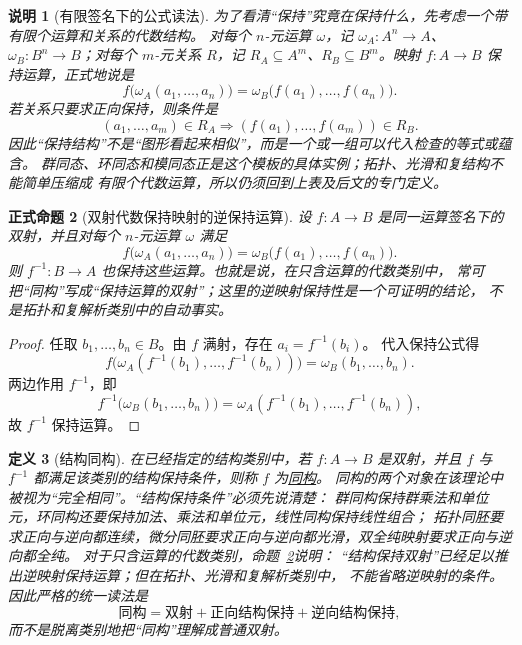 \documentclass[UTF8,fontset=none,a4paper,11pt]{ctexart}
\theoremstyle{foundation-definition}
\newtheorem{definition}{定义}[section]
\theoremstyle{foundation-theorem}
\theoremstyle{foundation-proposition}
\newtheorem{proposition}[definition]{正式命题}
\theoremstyle{foundation-example}
\theoremstyle{foundation-remark}
\newtheorem{remark}[definition]{说明}
\theoremstyle{foundation-theorem}
\newcommand{\term}[2]{\hyperref[#1]{#2}}
\begin{document}
\begin{remark}[有限签名下的公式读法]\label{rem:structure-signature-formulas}
为了看清“保持”究竟在保持什么，先考虑一个带有限个运算和关系的代数结构。
对每个 \(n\)-元运算 \(\omega\)，记
\(\omega_A:A^n\to A\)、\(\omega_B:B^n\to B\)；对每个 \(m\)-元关系 \(R\)，记
\(R_A\subseteq A^m\)、\(R_B\subseteq B^m\)。映射 \(f:A\to B\) 保持运算，正式地说是
\[
 f\bigl(\omega_A(a_1,\ldots,a_n)\bigr)
 =\omega_B\bigl(f(a_1),\ldots,f(a_n)\bigr).
\]
若关系只要求正向保持，则条件是
\[
 (a_1,\ldots,a_m)\in R_A
 \Longrightarrow
 (f(a_1),\ldots,f(a_m))\in R_B.
\]
因此“保持结构”不是“图形看起来相似”，而是一个或一组可以代入检查的等式或蕴含。
群同态、环同态和模同态正是这个模板的具体实例；拓扑、光滑和复结构不能简单压缩成
有限个代数运算，所以仍须回到上表及后文的专门定义。\end{remark}

\begin{proposition}[双射代数保持映射的逆保持运算]\label{prop:bijective-algebraic-map-inverse}
设 \(f:A\to B\) 是同一运算签名下的双射，并且对每个 \(n\)-元运算 \(\omega\) 满足
\[
f\bigl(\omega_A(a_1,\ldots,a_n)\bigr)
=\omega_B\bigl(f(a_1),\ldots,f(a_n)\bigr).
\]
则 \(f^{-1}:B\to A\) 也保持这些运算。也就是说，在只含运算的代数类别中，
常可把“同构”写成“保持运算的双射”；这里的逆映射保持性是一个可证明的结论，
不是拓扑和复解析类别中的自动事实。
\end{proposition}

\begin{proof}
任取 \(b_1,\ldots,b_n\in B\)。由 \(f\) 满射，存在 \(a_i=f^{-1}(b_i)\)。
代入保持公式得
\[
f\bigl(\omega_A(f^{-1}(b_1),\ldots,f^{-1}(b_n))\bigr)
=\omega_B(b_1,\ldots,b_n).
\]
两边作用 \(f^{-1}\)，即
\[
f^{-1}\bigl(\omega_B(b_1,\ldots,b_n)\bigr)
=\omega_A(f^{-1}(b_1),\ldots,f^{-1}(b_n)),
\]
故 \(f^{-1}\) 保持运算。\end{proof}

\begin{definition}[结构同构]\label{def:isomorphism}
在已经指定的结构类别中，若 \(f:A\to B\) 是双射，并且 \(f\) 与
\(f^{-1}\) 都满足该类别的结构保持条件，则称 \(f\) 为\term{def:isomorphism}{同构}。
同构的两个对象在该理论中被视为“完全相同”。“结构保持条件”必须先说清楚：
群同构保持群乘法和单位元，环同构还要保持加法、乘法和单位元，线性同构保持线性组合；
拓扑同胚要求正向与逆向都连续，微分同胚要求正向与逆向都光滑，双全纯映射要求正向与逆向都全纯。
对于只含运算的代数类别，命题~\ref{prop:bijective-algebraic-map-inverse}说明：
“结构保持双射”已经足以推出逆映射保持运算；但在拓扑、光滑和复解析类别中，
不能省略逆映射的条件。因此严格的统一读法是
\[
\text{同构}
=\text{双射}+\text{正向结构保持}+\text{逆向结构保持},
\]
而不是脱离类别地把“同构”理解成普通双射。
\end{definition}
\end{document}
